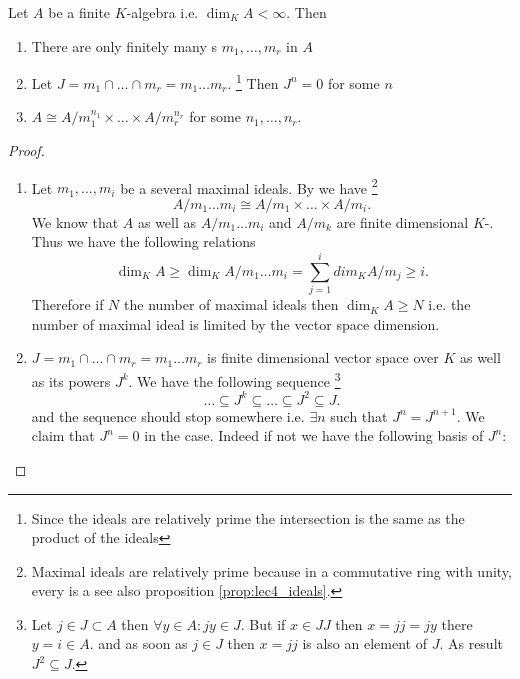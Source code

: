 \begin{theorem}
  Let $A$ be a finite $K$-algebra i.e.
  $\dim_K A < \infty$. Then
  \begin{enumerate}
  \item There are only finitely many s
    $m_1, \dots, m_r$ in $A$
  \item Let $J = m_1 \cap \dots \cap m_r = m_1 \dots m_r$.
    \footnote{
      Since the ideals are relatively prime the intersection is the
      same as the product of the ideals
    }
    Then
    $J^n = 0$ for some $n$
  \item
    $A \cong A/{m_1^{n_1}} \times \dots \times A/{m_r^{n_r}}$ for
    some $n_1, \dots, n_r$.    
  \end{enumerate}
  \begin{proof}
    \begin{enumerate}
    \item
      Let $m_1, \dots, m_i$ be a several maximal ideals. By
       we have
      \footnote{
        Maximal ideals are relatively prime because
        in a commutative ring with unity, every
         is a
         see also proposition
        \ref{prop:lec4_ideals}. 
      }
      \[
      A/m_1 \dots m_i \cong
      A/m_1 \times \dots \times A/m_i.
      \]
      We know that $A$ as well as $A/m_1 \dots m_i$ and $A/m_k$ are
      finite dimensional $K$-. Thus we have the
      following relations
      \[
      \dim_K A \ge \dim_K  A/m_1 \dots m_i  =
      \sum_{j=1}^i dim_K A/m_j \ge i.
      \]
      Therefore if $N$ the number of maximal ideals then
      $\dim_K A \ge N$ i.e. the number of maximal ideal is limited by
      the vector space dimension.
    \item
      $J = m_1 \cap \dots \cap m_r = m_1 \dots m_r$ is finite
      dimensional vector space over $K$ as well as its powers
      $J^k$. We have the following sequence
      \footnote {
        Let $j \in J \subset A$ then $\forall y \in A: j y \in J$.
        But if $x \in JJ$ then $x = jj = j y$ there $y = i \in A$. and
        as soon as $j \in J$ then $x = jj$ is also an element of
        $J$. As result $J^2 \subseteq J$.
      }
      \[
      \dots \subseteq J^k \subseteq \dots \subseteq
      J^2 \subseteq J.
      \]
      and the sequence should stop somewhere i.e.
      $\exists n$ such that $J^n = J^{n+1}$. We claim that $J^n = 0$
      in the case. Indeed if not we have the following basis of $J^n$:

\end{enumerate}
\end{proof}
\end{theorem}
